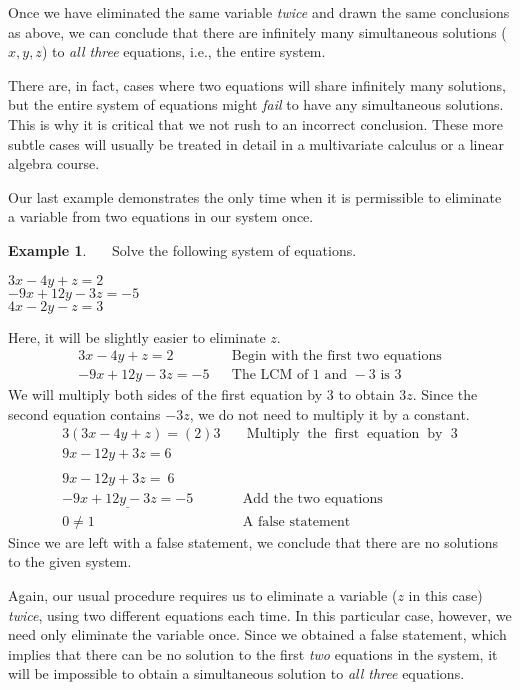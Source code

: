 \documentclass[12pt]{book}
\theoremstyle{definition}
\newtheorem{example}{Example}
\newcommand{\tmop}[1]{\ensuremath{\operatorname{#1}}}
\begin{document}
Once we have eliminated the same variable {\it twice} and drawn the same conclusions as above, we can conclude that there are infinitely many simultaneous solutions ($x,y,z$) to {\it all three} equations, i.e., the entire system.\par
There are, in fact, cases where two equations will share infinitely many solutions, but the entire system of equations might {\it fail} to have any simultaneous solutions.  This is why it is critical that we not rush to an incorrect conclusion.  These more subtle cases will usually be treated in detail in a multivariate calculus or a linear algebra course.\par
Our last example demonstrates the only time when it is permissible to eliminate a variable from two equations in our system once.
\begin{example}~~~Solve the following system of equations.
\begin{center}
		$3 x - 4 y + z = 2$\\
		$- 9 x + 12 y - 3 z = - 5~~~$\\
		$4 x - 2 y - z = 3$
\end{center}
Here, it will be slightly easier to eliminate $z$.
	\begin{eqnarray*}
    3 x - 4 y + z = 2~~ &  & \text{Begin~with~the~first~two~equations}\\
		- 9 x + 12 y - 3 z = - 5& & \text{The~LCM~of~} 1 \text{~and~} -3 \text{~is~} 3%
	\end{eqnarray*}
		We will multiply both sides of the first equation by 3 to obtain $3z$.  Since the second equation contains $-3z$, we do not need to multiply it by a constant.
	\begin{eqnarray*}
    3 (3 x - 4 y + z) = (2) 3 &  & \tmop{Multiply} \tmop{the} \tmop{first}
    \tmop{equation} \tmop{by~} 3\\
    9 x - 12 y + 3 z = 6~~~~ &  & \\
    &  & \\
    9 x - 12 y + 3 z = ~6~~ &  &\\
    \underline{- 9 x + 12 y - 3 z = - 5} &  & \text{Add~the~two~equations}\\
    0 \neq 1~~ &  & \tmop{A~false~statement}%
  \end{eqnarray*}
Since we are left with a false statement, we conclude that there are no solutions to the given system.
\end{example}
Again, our usual procedure requires us to eliminate a variable ($z$ in this case) {\it twice}, using two different equations each time.  In this particular case, however, we need only eliminate the variable once.  Since we obtained a false statement, which implies that there can be no solution to the first {\it two} equations in the system, it will be impossible to obtain a simultaneous solution to {\it all three} equations.\par
\end{document}
